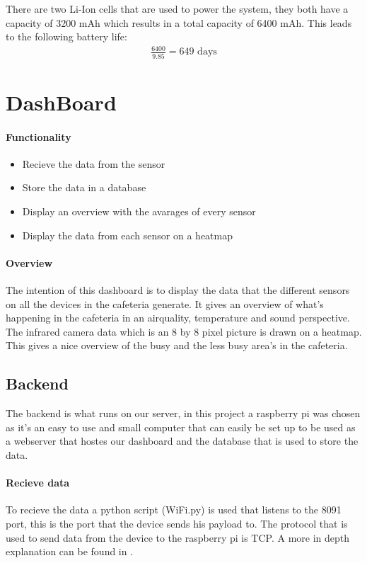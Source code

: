 \documentclass[11pt,a4paper]{article}
\begin{document}
There are two Li-Ion cells that are used to power the system, they both have a capacity of 3200 mAh which results in a total capacity of 6400 mAh. This leads to the following battery life:
\begin{gather*}
	\frac{6400}{9.85}=649 \text{ days}
\end{gather*}


\section{DashBoard}
\paragraph{Functionality}
\begin{itemize}
	\item Recieve the data from the sensor
	\item Store the data in a database
	\item Display an overview with the avarages of every sensor
	\item Display the data from each sensor on a heatmap
\end{itemize}

\paragraph{Overview}
The intention of this dashboard is to display the data that the different sensors on all the devices in the cafeteria generate.
It gives an overview of what's happening in the cafeteria in an airquality, temperature and sound perspective. 
The infrared camera data which is an 8 by 8 pixel picture is drawn on a heatmap. 
This gives a nice overview of the busy and the less busy area's in the cafeteria.  

\subsection{Backend}
The backend is what runs on our server, in this project a raspberry pi was chosen as it's an easy to use and small computer
 that can easily be set up to be used as a webserver that hostes our dashboard and the database that is used to store the data.

\paragraph{Recieve data}
To recieve the data a python script (WiFi.py) is used that listens to the 8091 port, this is the port that the device sends his payload to.
The protocol that is used to send data from the device to the raspberry pi is TCP. A more in depth explanation can be found in .
\end{document}
